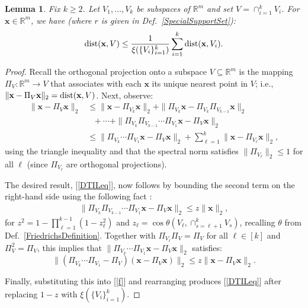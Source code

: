 \documentclass[9pt,twocolumn]{pnas-new}
\newtheorem{lemma}{Lemma}
\renewcommand{\eqref}[1]{\textnormal{[\ref{#1}]}}
\begin{document}
\begin{lemma}\label{DistanceToIntersectionLemma}
Fix $k \geq 2$. Let $V_1, \ldots, V_k$ be subspaces of $\mathbb{R}^m$ and set $V = \cap_{i = 1}^k V_i$. For  $\mathbf{x} \in \mathbb{R}^m$, we have (where $r$ is given in Def.~\ref{SpecialSupportSet}):
\begin{align}\label{DTILeq}
\text{\rm dist}(\mathbf{x}, V) \leq \frac{1}{\xi(\{V_i\}_{i = 1}^k)} \sum_{i=1}^k \text{\rm dist}(\mathbf{x}, V_i).
\end{align}
\end{lemma}
\begin{proof} 
Recall the orthogonal projection onto a subspace $V \subseteq \mathbb{R}^m$ is the mapping $\Pi_V: \mathbb{R}^m \to V$ that associates with each $\mathbf{x}$ its unique nearest point in $V$; i.e., $\|\mathbf{x} - \Pi_V\mathbf{x}\|_2 = \text{\rm dist}(\mathbf{x}, V)$.
Next, observe:
\begin{align}\label{f}
\|\mathbf{x} - \Pi_V\mathbf{x}\|_2 &\leq \|\mathbf{x} - \Pi_{V_k} \mathbf{x}\|_2 + \|\Pi_{V_k}  \mathbf{x} - \Pi_{V_k}\Pi_{V_{k-1}}\mathbf{x}\|_2 \nonumber \\
&\ \ \ + \cdots + \|\Pi_{V_k} \Pi_{V_{k-1}}\cdots \Pi_{V_1} \mathbf{x} - \Pi_V \mathbf{x}\|_2 \nonumber \\
&\leq \|\Pi_{V_k}\cdots\Pi_{V_{1}} \mathbf{x} - \Pi_V \mathbf{x}\|_2 + \sum_{\ell=1}^k \|\mathbf{x} - \Pi_{V_{\ell}} \mathbf{x}\|_2,
\end{align}
using the triangle inequality and that the spectral norm satisfies $\|\Pi_{V_{\ell}}\|_2 \leq 1$ for all $\ell$ (since $\Pi_{V_{\ell}}$ are orthogonal projections).

The desired result, \eqref{DTILeq}, now follows by bounding the second term on the right-hand side using the following fact \cite[Thm.~9.33]{Deutsch12}:
\begin{align}
\|\Pi_{V_k}\Pi_{V_{k-1}}\cdots\Pi_{V_1} \mathbf{x} - \Pi_V\mathbf{x}\|_2 \leq z \|\mathbf{x}\|_2,
\end{align}
for \mbox{$z^2= 1 - \prod_{\ell =1}^{k-1}(1-z_{\ell}^2)$} and \mbox{$z_{\ell} = \cos\theta\left(V_{\ell}, \cap_{s=\ell+1}^k V_s\right)$}, recalling $\theta$ from Def.~\ref{FriedrichsDefinition}. Together with $\Pi_{V_\ell} \Pi_V = \Pi_V$ for all $\ell \in [k]$ and $\Pi_V^2 = \Pi_V$, this implies that $\|\Pi_{V_k} \cdots \Pi_{V_1}\mathbf{x}  - \Pi_V \mathbf{x} \|_2$ satisfies:
\[\| ( \Pi_{V_k} \cdots\Pi_{V_1} - \Pi_V ) (\mathbf{x} - \Pi_V\mathbf{x})\|_2 \leq z\|\mathbf{x} - \Pi_V\mathbf{x}\|_2.\]

Finally, substituting this into \eqref{f} and rearranging produces \eqref{DTILeq} after replacing $1 - z$ with $\xi(\{V_i\}_{i=1}^k)$.
\end{proof}
\end{document}

